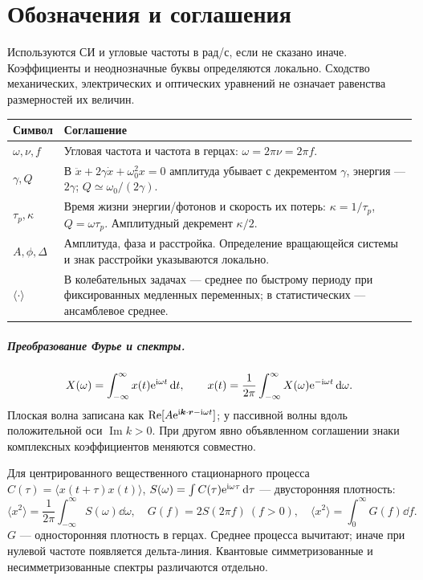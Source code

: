 \chapter*{Обозначения и соглашения}
Используются СИ и угловые частоты в рад/с, если не сказано иначе. Коэффициенты и неоднозначные буквы определяются локально. Сходство механических, электрических и оптических уравнений не означает равенства размерностей их величин.

\begin{longtable}{p{}p{}}
\toprule Символ & Соглашение\\\midrule
$\omega,\nu,f$ & Угловая частота и частота в герцах: $\omega=2\pi\nu=2\pi f$.\\
$\gamma,Q$ & В $\ddot x+2\gamma\dot x+\omega_0^2x=0$ амплитуда убывает с декрементом $\gamma$, энергия — $2\gamma$; $Q\simeq\omega_0/(2\gamma)$.\\
$\tau_p,\kappa$ & Время жизни энергии/фотонов и скорость их потерь: $\kappa=1/\tau_p$, $Q=\omega\tau_p$. Амплитудный декремент $\kappa/2$.\\
$A,\phi,\Delta$ & Амплитуда, фаза и расстройка. Определение вращающейся системы и знак расстройки указываются локально.\\
$\langle\cdot\rangle$ & В колебательных задачах — среднее по быстрому периоду при фиксированных медленных переменных; в статистических — ансамблевое среднее.\\
\bottomrule
\end{longtable}

\paragraph{Преобразование Фурье и спектры.}
\begin{equation*}
 X(\omega)=\int_{-\infty}^{\infty}x(t)\mathrm{e}^{\mathrm{i}\omega t}\mathop{}\!\mathrm{d} t,\qquad
 x(t)=\frac1{2\pi}\int_{-\infty}^{\infty}X(\omega)\mathrm{e}^{-\mathrm{i}\omega t}\mathop{}\!\mathrm{d}\omega.
\end{equation*}
Плоская волна записана как $\operatorname{Re}[A\mathrm{e}^{\mathrm{i}\bm k\cdot\bm r-\mathrm{i}\omega t}]$; у пассивной волны вдоль положительной оси $\operatorname{Im}k>0$. При другом явно объявленном соглашении знаки комплексных коэффициентов меняются совместно.

Для центрированного вещественного стационарного процесса $C(\tau)=\langle x(t+\tau)x(t)\rangle$, $S(\omega)=\int C(\tau)\mathrm{e}^{\mathrm{i}\omega\tau}\mathop{}\!\mathrm{d}\tau$ — двусторонняя плотность:
\begin{equation*}
 \langle x^2\rangle=\frac1{2\pi}\int_{-\infty}^{\infty}S(\omega)\dd\omega,
 \quad G(f)=2S(2\pi f)\ (f>0),\quad
 \langle x^2\rangle=\int_0^\infty G(f)\dd f.
\end{equation*}
$G$ — односторонняя плотность в герцах. Среднее процесса вычитают; иначе при нулевой частоте появляется дельта-линия. Квантовые симметризованные и несимметризованные спектры различаются отдельно.

